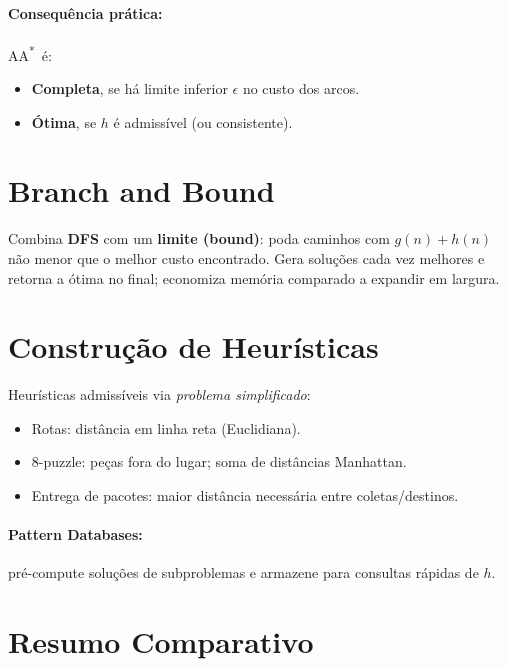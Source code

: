 \documentclass[9pt,a4paper]{extarticle}
\newcommand{\Astar}{A\textsuperscript{*}}
\begin{document}
\paragraph{Consequência prática:}
A\Astar\ é:
\begin{itemize}
  \item \textbf{Completa}, se há limite inferior $\epsilon$ no custo dos arcos.
  \item \textbf{Ótima}, se $h$ é admissível (ou consistente).
\end{itemize}

\section{Branch and Bound}

Combina \textbf{DFS} com um \textbf{limite (bound)}: poda caminhos com $g(n)+h(n)$ não menor que o melhor custo encontrado.
Gera soluções cada vez melhores e retorna a ótima no final; economiza memória comparado a expandir em largura.

\section{Construção de Heurísticas}

Heurísticas admissíveis via \emph{problema simplificado}:
\begin{itemize}
  \item Rotas: distância em linha reta (Euclidiana).
  \item 8-puzzle: peças fora do lugar; soma de distâncias Manhattan.
  \item Entrega de pacotes: maior distância necessária entre coletas/destinos.
\end{itemize}

\paragraph{Pattern Databases:} pré-compute soluções de subproblemas e armazene para consultas rápidas de $h$.

\section{Resumo Comparativo}
\end{document}
